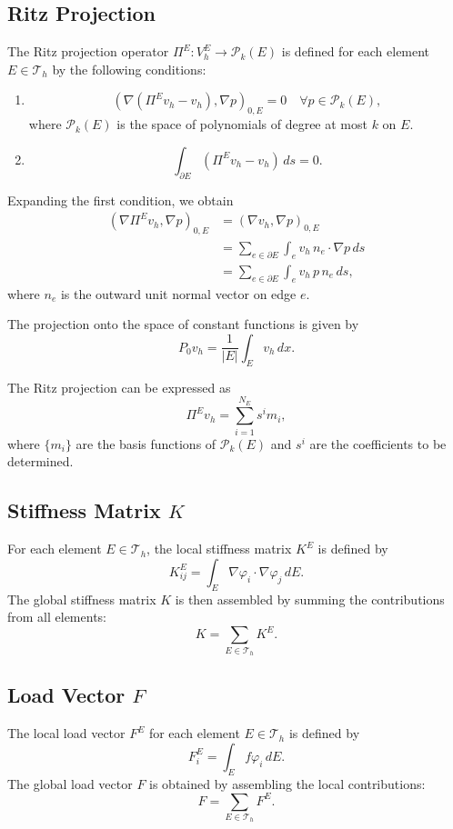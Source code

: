 \documentclass[class=article, crop=false]{standalone}
\begin{document}
\subsection{Ritz Projection}
The Ritz projection operator $\Pi^E: V_h^E \rightarrow \mathcal{P}_k(E)$ is defined for each element $E \in \mathcal{T}_h$ by the following conditions:
\begin{enumerate}
    \item
    \[
    (\nabla (\Pi^E v_h - v_h), \nabla p)_{0,E} = 0 \quad \forall p \in \mathcal{P}_k(E),
    \]
    where $\mathcal{P}_k(E)$ is the space of polynomials of degree at most $k$ on $E$.
    
    \item
    \[
    \int_{\partial E} (\Pi^E v_h - v_h) \, ds = 0.
    \]
\end{enumerate}

Expanding the first condition, we obtain
\begin{align*}
(\nabla \Pi^E v_h, \nabla p)_{0,E} &= (\nabla v_h, \nabla p)_{0,E} \\
&= \sum_{e \in \partial E} \int_e v_h \, n_e \cdot \nabla p \, ds \\
&= \sum_{e \in \partial E} \int_e v_h \, p \, n_e \, ds,
\end{align*}
where $n_e$ is the outward unit normal vector on edge $e$.

The projection onto the space of constant functions is given by
\[
P_0 v_h = \frac{1}{|E|} \int_E v_h \, dx.
\]

The Ritz projection can be expressed as
\[
\Pi^E v_h = \sum_{i=1}^{N_E} s^i m_i,
\]
where $\{m_i\}$ are the basis functions of $\mathcal{P}_k(E)$ and $s^i$ are the coefficients to be determined.


\subsection{Stiffness Matrix $K$}
For each element $E \in \mathcal{T}_h$, the local stiffness matrix $K^E$ is defined by
\[
K^E_{ij} = \int_E \nabla \varphi_i \cdot \nabla \varphi_j \, dE.
\]
The global stiffness matrix $K$ is then assembled by summing the contributions from all elements:
\begin{equation}
    K = \sum_{E \in \mathcal{T}_h} K^E.
\end{equation}

\subsection{Load Vector $F$}
The local load vector $F^E$ for each element $E \in \mathcal{T}_h$ is defined by
\[
F^E_i = \int_E f \varphi_i \, dE.
\]
The global load vector $F$ is obtained by assembling the local contributions:
\begin{equation}
    F = \sum_{E \in \mathcal{T}_h} F^E.
\end{equation}
\end{document}
